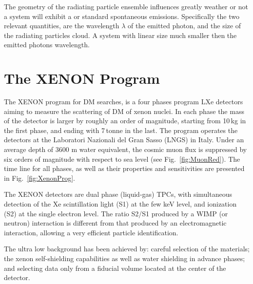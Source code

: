 The geometry of the radiating particle ensemble influences greatly weather or not a system will exhibit a \superradiance or standard spontaneous emissions. Specifically the two relevant quantities, are the wavelength $\lambda$ of the emitted photon, and the size of the radiating particles cloud. A system with linear size much smaller then the emitted photons wavelength.   




\section{The XENON Program}
\label{sec:xenonProg}

The XENON program for DM searches, is a four phases program LXe detectors aiming to measure the scattering of DM of xenon nuclei. In each phase the mass of the detector is larger by roughly an order of magnitude, starting from 10\,kg in the first phase, and ending with 7\,tonne in the last. The program operates the detectors at the Laboratori Nazionali del Gran Sasso (LNGS) in Italy. Under an average depth of 3600 m water equivalent, the cosmic muon
flux is suppressed by six orders of magnitude with respect to sea level (see Fig.~\ref{fig:MuonRed}). The time line for all phases, as well as their properties and sensitivities are presented in Fig.~\ref{fig:XenonProg}.

The XENON detectors are dual phase (liquid-gas) TPCs, with simultaneous
detection of the Xe scintillation light (S1) at the few keV level, and ionization (S2) at the single electron level. The ratio S2/S1 produced by a WIMP (or neutron) interaction is different from that produced by an electromagnetic interaction, allowing a very efficient particle identification.

The ultra low background has been achieved by: careful selection of the materials; the xenon self-shielding capabilities as well as water shielding in advance phases; and selecting data only from a fiducial volume located at the center of the detector.

